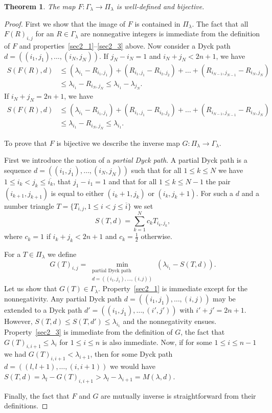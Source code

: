 \documentclass[10pt,a4paper]{article}
\newtheorem{theo}{Theorem}[section]
\theoremstyle{remark}\newtheorem{rema}[theo]{Remark}
\newcommand{\la}{\lambda}
\begin{document}
\begin{theo}
The map $F:\Gamma_\la\to\Pi_\la$ is well-defined and bijective.
\end{theo}
\begin{proof}
First we show that the image of $F$ is contained in $\Pi_\lambda$. The fact that all $F(R)_{i,j}$ for an $R\in\Gamma_\la$ are nonnegative integers is immediate from the definition of $F$ and properties~\eqref{sec2_1}--\eqref{sec2_3} above. Now consider a Dyck path $d=((i_1,j_1),\dots,(i_N,j_N))$. If $j_N-i_N=1$ and $i_N+j_N<2n+1$, we have
\begin{align*}
S(F(R),d)&\le (\la_{i_1}-R_{i_1,j_1})+(R_{i_1,j_1}-R_{i_2,j_2})+\dots+(R_{i_{N-1},j_{N-1}}-R_{i_N,j_N})\\ 
&\le \la_{i_1}-R_{i_N,j_N}\le\la_{i_1}-\la_{j_N}.
\end{align*}
If $i_N+j_N=2n+1$, we have
\begin{align*}
S(F(R),d)&\le (\la_{i_1}-R_{i_1,j_1})+(R_{i_1,j_1}-R_{i_2,j_2})+\dots+(R_{i_{N-1},j_{N-1}}-R_{i_N,j_N})\\
&\le \la_{i_1}-R_{i_N,j_N}\le\la_{i_1}.
\end{align*}

To prove that $F$ is bijective we describe the inverse map $G:\Pi_\la\to\Gamma_\la$.

First we introduce the notion of a \emph{partial Dyck path}. A partial Dyck path is a sequence $d=((i_1,j_1),\dots,(i_N,j_N))$ such that for all $1\le k\le N$ we have $1\le i_k<j_k\le \overline{i_k}$, that $j_1-i_1=1$ and that for all $1\le k\le N-1$ the pair $(i_{k+1},j_{k+1})$ is equal to either $(i_k+1,j_k)$ or $(i_k,j_k+1)$. For such a $d$ and a number triangle $T=\{T_{i,j},1\le i<j\le \overline i\}$ we set
\[
S(T,d)=\sum_{k=1}^N c_k T_{i_k,j_k},
\]
where $c_k=1$ if $i_k+j_k<2n+1$ and $c_k=\frac12$ otherwise.

For a $T\in\Pi_\la$ we define
\[
G(T)_{i,j}=\min\limits_{\substack{\text{partial Dyck path}\\d=((i_1,j_1),\dots,(i,j))}}(\la_{i_1}-S(T,d)).
\]
Let us show that $G(T)\in\Gamma_\la$. Property~\eqref{sec2_1} is immediate except for the nonnegativity. Any partial Dyck path $d=((i_1,j_1),\dots,(i,j))$ may be extended to a Dyck path $d'=((i_1,j_1),\dots,(i',j'))$ with $i'+j'=2n+1$. However, $S(T,d)\le S(T,d')\le\la_{i_1}$ and the nonnegativity ensues. Property~\eqref{sec2_3} is immediate from the definition of $G$, the fact that $G(T)_{i,i+1}\le\la_i$ for $1\le i\le n$ is also immediate. Now, if for some $1\le i\le n-1$ we had $G(T)_{i,i+1}<\la_{i+1}$, then for some Dyck path $d=((l,l+1),\dots,(i,i+1))$ we would have $S(T,d)=\la_l-G(T)_{i,i+1}>\la_l-\la_{i+1}=M(\la,d)$.

Finally, the fact that $F$ and $G$ are mutually inverse is straightforward from their definitions.
\end{proof}
\end{document}

